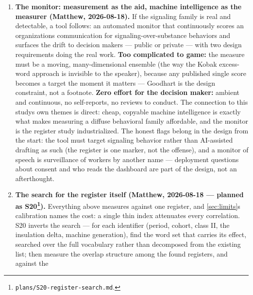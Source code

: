 \begin{enumerate}
  (answering upward, insulated from outcomes) generates all of them. The
  quality arm\textquotesingle s DQI machinery is a starting point for the speech side;
  the detector-independent moves in group B above --- the outside-the-archive
  items --- matter doubly here, since the claim is about the behavior, not
  about any one detector\textquotesingle s opinion of it.
\item
  \textbf{The monitor: measurement as the aid, machine intelligence as the
  measurer (Matthew, 2026-08-18).} If the signaling family is real and
  detectable, a tool follows: an automated monitor that continuously scores
  an organization\textquotesingle s communication for signaling-over-substance behaviors and
  surfaces the drift to decision makers --- public or private --- with two
  design requirements doing the real work. \textbf{Too complicated to game:} the
  measure must be a moving, many-dimensional ensemble (the way the Kobak
  excess-word approach is invisible to the speaker), because any published
  single score becomes a target the moment it matters --- Goodhart is the
  design constraint, not a footnote. \textbf{Zero effort for the decision maker:}
  ambient and continuous, no self-reports, no reviews to conduct. The
  connection to this study\textquotesingle s own themes is direct: cheap, copyable machine
  intelligence is exactly what makes measuring a diffuse behavioral family
  affordable, and the monitor is the register study industrialized. The
  honest flags belong in the design from the start: the tool must target
  signaling behavior rather than AI-assisted drafting as such (the register
  is one marker, not the offense), and a monitor of speech is surveillance
  of workers by another name --- deployment questions about consent and
  who reads the dashboard are part of the design, not an afterthought.
\item
  \textbf{The search for the register itself (Matthew, 2026-08-18 --- planned as
  S20\footnote{\texttt{plans/\allowbreak{}S20-\allowbreak{}register-\allowbreak{}search.\allowbreak{}md}.}).} Everything above measures against
  one register, and \cref{sec:limits}\textquotesingle s calibration names the cost: a single thin index
  attenuates every correlation. S20 inverts the search --- for each
  identifier (period, cohort, class II, the insulation delta, machine
  generation), find the word set that carries its effect, searched over
  the full vocabulary rather than decomposed from the existing list; then
  measure the overlap structure among the found registers, and against the

\end{enumerate}
